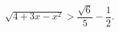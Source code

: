 \begin{ex}[type=inequality]
	\begin{condition}
		$ \sqrt{4 + 3x - x^2}>\dfrac{\sqrt{6}}{5} - \dfrac{1}{2}.$
	\end{condition}
\end{ex}